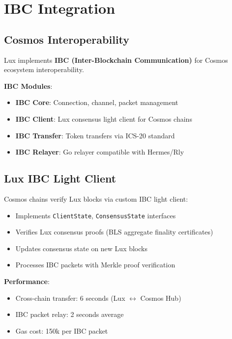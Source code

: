 \section{IBC Integration}


\subsection{Cosmos Interoperability}

Lux implements \textbf{IBC (Inter-Blockchain Communication)} for Cosmos ecosystem interoperability.

\textbf{IBC Modules}:
\begin{itemize}[leftmargin=1.1em]
  \item \textbf{IBC Core}: Connection, channel, packet management
  \item \textbf{IBC Client}: Lux consensus light client for Cosmos chains
  \item \textbf{IBC Transfer}: Token transfers via ICS-20 standard
  \item \textbf{IBC Relayer}: Go relayer compatible with Hermes/Rly
\end{itemize}

\subsection{Lux IBC Light Client}

Cosmos chains verify Lux blocks via custom IBC light client:
\begin{itemize}[leftmargin=1.1em]
  \item Implements \texttt{ClientState}, \texttt{ConsensusState} interfaces
  \item Verifies Lux consensus proofs (BLS aggregate finality certificates)
  \item Updates consensus state on new Lux blocks
  \item Processes IBC packets with Merkle proof verification
\end{itemize}

\textbf{Performance}:
\begin{itemize}[leftmargin=1.1em]
  \item Cross-chain transfer: 6 seconds (Lux $\leftrightarrow$ Cosmos Hub)
  \item IBC packet relay: 2 seconds average
  \item Gas cost: 150k per IBC packet
\end{itemize}

